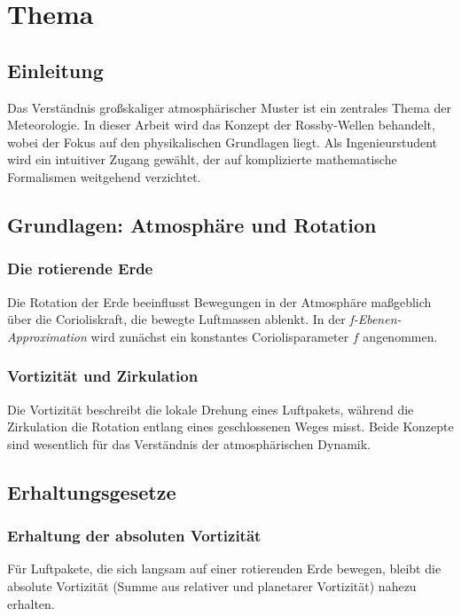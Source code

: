 %
%
%
%
\chapter{Thema\label{chapter:rossby}}
\begin{refsection}

\section{Einleitung}
Das Verständnis großskaliger atmosphärischer Muster ist ein zentrales Thema der Meteorologie. In dieser Arbeit wird das Konzept der Rossby-Wellen behandelt, wobei der Fokus auf den physikalischen Grundlagen liegt. Als Ingenieurstudent wird ein intuitiver Zugang gewählt, der auf komplizierte mathematische Formalismen weitgehend verzichtet.

\section{Grundlagen: Atmosphäre und Rotation}

\subsection{Die rotierende Erde}
Die Rotation der Erde beeinflusst Bewegungen in der Atmosphäre maßgeblich über die Corioliskraft, die bewegte Luftmassen ablenkt. In der \textit{f-Ebenen-Approximation} wird zunächst ein konstantes Coriolisparameter \( f \) angenommen.

\subsection{Vortizität und Zirkulation}
Die Vortizität beschreibt die lokale Drehung eines Luftpakets, während die Zirkulation die Rotation entlang eines geschlossenen Weges misst. Beide Konzepte sind wesentlich für das Verständnis der atmosphärischen Dynamik.

\section{Erhaltungsgesetze}

\subsection{Erhaltung der absoluten Vortizität}
Für Luftpakete, die sich langsam auf einer rotierenden Erde bewegen, bleibt die absolute Vortizität (Summe aus relativer und planetarer Vortizität) nahezu erhalten.


\end{refsection}
